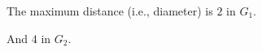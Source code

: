 \documentclass[
    preview, 
    varwidth = 4cm, 
    border = {2pt 0pt 0pt 0pt}
    ]{standalone} %
\begin{document}





The maximum distance (i.e., diameter) is 
\(2\) in \(G_1\). 
\vspace{1em}

And \(4\) in \(G_2\).
\end{document}

